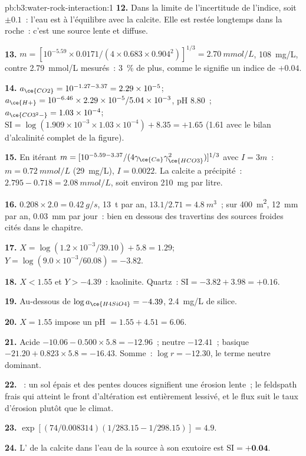 \begin{solution}{pb:b3:water-rock-interaction:1}
\textbf{12.} Dans la limite de l'incertitude de l'indice, soit $\pm0.1$~: l'eau est
à l'équilibre avec la calcite. Elle est restée longtemps dans la roche~: c'est une source
lente et diffuse.

\textbf{13.} $m = [10^{-5.59}\times0.0171/(4\times0.683\times0.904^2)]^{1/3}
= \qty{2.70}{mmol/L}$, \qty{108}{mg/L}, contre \qty{2.79}{mmol/L} mesurés~:
\qty{3}{\percent} de plus, comme le signifie un indice de $+0.04$.

\textbf{14.} $a_{\ce{CO2}} = 10^{-1.27 - 3.37} = 2.29\times10^{-5}$;
$a_{\ce{H+}} = 10^{-6.46}\times2.29\times10^{-5}/5.04\times10^{-3}$, pH 8.80~;
$a_{\ce{CO3^2-}} = 1.03\times10^{-4}$; $\mathrm{SI} = \log(1.909\times
10^{-3}\times1.03\times10^{-4}) + 8.35 = +1.65$ (1.61 avec le bilan
d'alcalinité complet de la figure).

\textbf{15.} En itérant $m = [10^{-5.59 - 3.37}/(4\gamma_{\ce{Ca}}
\gamma_{\ce{HCO3}}^2)]^{1/3}$ avec $I = 3m$~: $m = \qty{0.72}{mmol/L}$
(\qty{29}{mg/L}), $I = 0.0022$. La calcite a précipité~: $2.795 - 0.718 =
\qty{2.08}{mmol/L}$, soit environ \qty{210}{mg} par litre.

\textbf{16.} $0.208\times2.0 = \qty{0.42}{g/s}$, \qty{13}{t} par an,
$13.1/2.71 = \qty{4.8}{m^3}$~; sur \qty{400}{m^2}, \qty{12}{mm} par an,
\qty{0.03}{mm} par jour~: bien en dessous des travertins des sources froides cités dans le chapitre.

\textbf{17.} $X = \log(1.2\times10^{-3}/39.10) + 5.8 = 1.29$; $Y =
\log(9.0\times10^{-3}/60.08) = -3.82$.

\textbf{18.} $X < 1.55$ et $Y > -4.39$~: kaolinite. Quartz~: $\mathrm{SI} =
-3.82 + 3.98 = +0.16$.

\textbf{19.} Au-dessous de $\log a_{\ce{H4SiO4}} = -4.39$, \qty{2.4}{mg/L} de
silice.

\textbf{20.} $X = 1.55$ impose un pH $= 1.55 + 4.51 = 6.06$.

\textbf{21.} Acide $-10.06 - 0.500\times5.8 = -12.96$~; neutre $-12.41$~; basique
$-21.20 + 0.823\times5.8 = -16.43$. Somme~: $\log r = -12.30$, le terme neutre
dominant.

\textbf{22.} ~: un sol épais et des pentes douces signifient une érosion lente~;
le feldspath frais qui atteint le front d'altération est entièrement lessivé, et
le flux suit le taux d'érosion plutôt que le climat.

\textbf{23.} $\exp[(74/0.008314)(1/283.15 - 1/298.15)] = 4.9$.

\textbf{24.} L' de la calcite dans l'eau de la source à son exutoire
est $\mathrm{SI} = \textbf{+0.04}$.
\end{solution}
